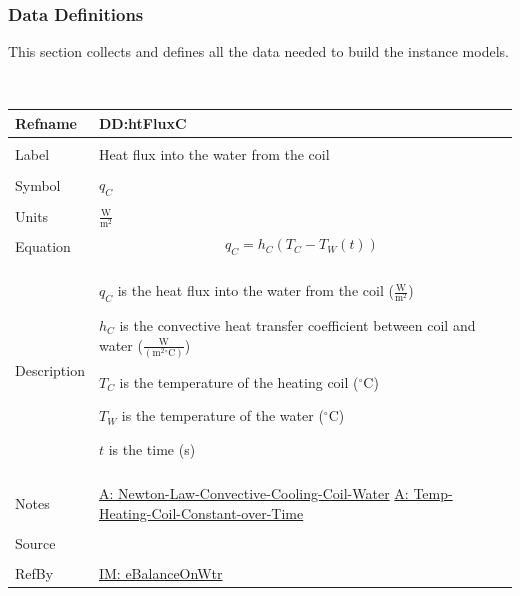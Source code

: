 \documentclass[12pt]{article}
\begin{document}
\subsubsection{Data Definitions}
\label{Sec:DDs}
This section collects and defines all the data needed to build the instance models.
\par~

\noindent \begin{minipage}{\textwidth}
\begin{tabular}{p{} p{}}
\toprule \textbf{Refname} & \textbf{DD:htFluxC}
\label{DD:htFluxC}
\\ \midrule \\
Label & Heat flux into the water from the coil
\\ \midrule \\
Symbol & ${q_{C}}$
\\ \midrule \\
Units & $\frac{\text{W}}{\text{m}^{2}}$
\\ \midrule \\
Equation & \begin{displaymath}
           {q_{C}}={h_{C}} \left({T_{C}}-{T_{W}}\left(t\right)\right)
           \end{displaymath}
\\ \midrule \\
Description & \begin{symbDescription}
              \item{${q_{C}}$ is the heat flux into the water from the coil ($\frac{\text{W}}{\text{m}^{2}}$)}
              \item{${h_{C}}$ is the convective heat transfer coefficient between coil and water ($\frac{\text{W}}{(\text{m}^{2}{}^{\circ}\text{C})}$)}
              \item{${T_{C}}$ is the temperature of the heating coil (${}^{\circ}$C)}
              \item{${T_{W}}$ is the temperature of the water (${}^{\circ}$C)}
              \item{$t$ is the time (s)}
              \end{symbDescription}
\\ \midrule \\
Notes & \hyperref[assumpLCCCW]{A: Newton-Law-Convective-Cooling-Coil-Water}
        \hyperref[assumpTHCCoT]{A: Temp-Heating-Coil-Constant-over-Time}
\\ \midrule \\
Source & \cite{koothoor2013}
\\ \midrule \\
RefBy & \hyperref[IM:eBalanceOnWtr]{IM: eBalanceOnWtr}
\\ \bottomrule \end{tabular}
\end{minipage}
\par~
\end{document}

